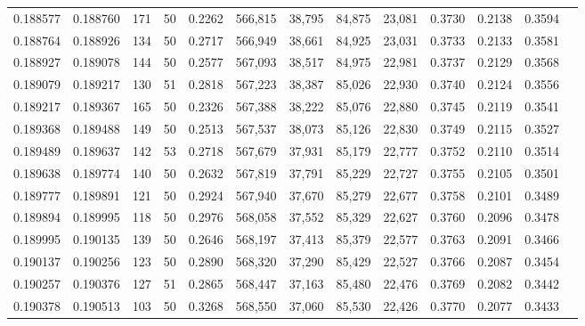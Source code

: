 \begin{tabular}{rrrrrrrrrrrrr}
0.188577 & 0.188760 &   171 &  50 &                                     0.2262 & 566,815 &  38,795 &  84,875 &  23,081 & 0.3730 & 0.2138 & 0.3594 \\
0.188764 & 0.188926 &   134 &  50 &                                     0.2717 & 566,949 &  38,661 &  84,925 &  23,031 & 0.3733 & 0.2133 & 0.3581 \\
0.188927 & 0.189078 &   144 &  50 &                                     0.2577 & 567,093 &  38,517 &  84,975 &  22,981 & 0.3737 & 0.2129 & 0.3568 \\
0.189079 & 0.189217 &   130 &  51 &                                     0.2818 & 567,223 &  38,387 &  85,026 &  22,930 & 0.3740 & 0.2124 & 0.3556 \\
0.189217 & 0.189367 &   165 &  50 &                                     0.2326 & 567,388 &  38,222 &  85,076 &  22,880 & 0.3745 & 0.2119 & 0.3541 \\
0.189368 & 0.189488 &   149 &  50 &                                     0.2513 & 567,537 &  38,073 &  85,126 &  22,830 & 0.3749 & 0.2115 & 0.3527 \\
0.189489 & 0.189637 &   142 &  53 &                                     0.2718 & 567,679 &  37,931 &  85,179 &  22,777 & 0.3752 & 0.2110 & 0.3514 \\
0.189638 & 0.189774 &   140 &  50 &                                     0.2632 & 567,819 &  37,791 &  85,229 &  22,727 & 0.3755 & 0.2105 & 0.3501 \\
0.189777 & 0.189891 &   121 &  50 &                                     0.2924 & 567,940 &  37,670 &  85,279 &  22,677 & 0.3758 & 0.2101 & 0.3489 \\
0.189894 & 0.189995 &   118 &  50 &                                     0.2976 & 568,058 &  37,552 &  85,329 &  22,627 & 0.3760 & 0.2096 & 0.3478 \\
0.189995 & 0.190135 &   139 &  50 &                                     0.2646 & 568,197 &  37,413 &  85,379 &  22,577 & 0.3763 & 0.2091 & 0.3466 \\
0.190137 & 0.190256 &   123 &  50 &                                     0.2890 & 568,320 &  37,290 &  85,429 &  22,527 & 0.3766 & 0.2087 & 0.3454 \\
0.190257 & 0.190376 &   127 &  51 &                                     0.2865 & 568,447 &  37,163 &  85,480 &  22,476 & 0.3769 & 0.2082 & 0.3442 \\
0.190378 & 0.190513 &   103 &  50 &                                     0.3268 & 568,550 &  37,060 &  85,530 &  22,426 & 0.3770 & 0.2077 & 0.3433 \\

\end{tabular}
